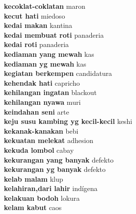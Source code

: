 \textbf{ kecoklat-coklatan  } maron \\
\textbf{ kecut hati  } miedoso \\
\textbf{ kedai makan  } kantina \\
\textbf{ kedai membuat roti  } panaderia \\
\textbf{ kedai roti  } panaderia \\
\textbf{ kediaman yang mewah  } kas \\
\textbf{ kediaman yg mewah  } kas \\
\textbf{ kegiatan berkempen  } candidatura \\
\textbf{ kehendak hati  } capricho \\
\textbf{ kehilangan ingatan  } blackout \\
\textbf{ kehilangan nyawa  } muri \\
\textbf{ keindahan seni  } arte \\
\textbf{ keju susu kambing yg kecil-kecil  } keshi \\
\textbf{ kekanak-kanakan  } bebi \\
\textbf{ kekuatan melekat  } adhesion \\
\textbf{ kekuda lombol  } cabay \\
\textbf{ kekurangan yang banyak  } defekto \\
\textbf{ kekurangan yg banyak  } defekto \\
\textbf{ kelab malam  } klup \\
\textbf{ kelahiran,dari lahir  } indígena \\
\textbf{ kelakuan bodoh  } lokura \\
\textbf{ kelam kabut  } caos \\
